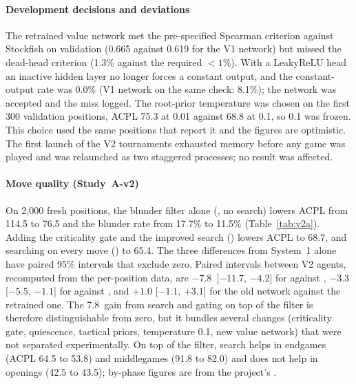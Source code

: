 \paragraph*{Development decisions and deviations}
The retrained value network met the pre-specified Spearman criterion against Stockfish on validation (0.665 against 0.619 for the V1 network) but missed the dead-head criterion (1.3\% against the required $<1\%$). With a LeakyReLU head an inactive hidden layer no longer forces a constant output, and the constant-output rate was 0.0\% (V1 network on the same check: 8.1\%); the network was accepted and the miss logged. The root-prior temperature was chosen on the first 300 validation positions, ACPL 75.3 at 0.01 against 68.8 at 0.1, so 0.1 was frozen. This choice used the same positions that report it and the figures are optimistic. The first launch of the V2 tournaments exhausted memory before any game was played and was relaunched as two staggered processes; no result was affected.

\paragraph*{Move quality (Study~A-v2)}
On 2{,}000 fresh positions, the blunder filter alone (, no search) lowers ACPL from 114.5 to 76.5 and the blunder rate from 17.7\% to 11.5\% (Table~\ref{tab:v2a}). Adding the criticality gate and the improved search () lowers ACPL to 68.7, and searching on every move () to 65.4. The three differences from System~1 alone have paired 95\% intervals that exclude zero. Paired intervals between V2 agents, recomputed from the per-position data, are $-7.8$\cp\ [$-11.7$, $-4.2$] for  against , $-3.3$ [$-5.5$, $-1.1$] for  against , and $+1.0$ [$-1.1$, $+3.1$] for the old network against the retrained one. The 7.8\cp\ gain from search and gating on top of the filter is therefore distinguishable from zero, but it bundles several changes (criticality gate, quiescence, tactical priors, temperature 0.1, new value network) that were not separated experimentally. On top of the filter, search helps in endgames (ACPL 64.5 to 53.8) and middlegames (91.8 to 82.0) and does not help in openings (42.5 to 43.5); by-phase figures are from the project's .

\begin{table}[t]
\centering
\caption{Study~A-v2 (fresh month 2025-03, 2{,}000 positions per agent; read from result files). Bl.\ is the blunder rate, S2 the share of moves searched, ms the mean time per move, and $\Delta$ACPL the paired difference from  (bootstrap over positions). $^{\dagger}$Added post hoc after the tournament, on the same positions.}
\label{tab:v2a}

\end{table}

